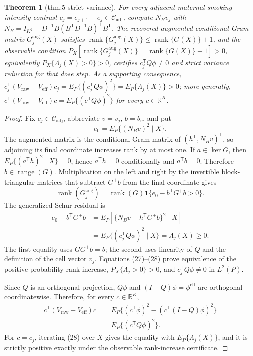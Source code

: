 \documentclass{article}
\newtheorem{theorem}{Theorem}
\begin{document}
\begin{theorem}[thm:5-strict-variance]\label{thm:5-strict-variance}
For every adjacent maternal-smoking intensity contrast \(c_j=e_{j+1}-e_j\in\mathcal C_{\mathrm{adj}}\), compute \(N_Bv_j\) with \(N_B=I_{K^{2}}-D^{-1}B(B^{\mathsf T}D^{-1}B)^{+}B^{\mathsf T}\). The recovered augmented conditional Gram matrix \(G_j^{\mathrm{aug}}(X)\) satisfies \(\operatorname{rank}\{G_j^{\mathrm{aug}}(X)\}\leq\operatorname{rank}\{G(X)\}+1\), and the observable condition \(P_X[\operatorname{rank}\{G_j^{\mathrm{aug}}(X)\}=\operatorname{rank}\{G(X)\}+1]>0\), equivalently \(P_X\{\Lambda_j(X)>0\}>0\), certifies \(c_j^{\mathsf T}Q\phi\neq0\) and strict variance reduction for that dose step. As a supporting consequence, \(c_j^{\mathsf T}(V_{\mathrm{raw}}-V_{\mathrm{eff}})c_j=E_P\{(c_j^{\mathsf T}Q\phi)^2\}=E_P\{\Lambda_j(X)\}>0\); more generally, \(c^{\mathsf T}(V_{\mathrm{raw}}-V_{\mathrm{eff}})c=E_P\{(c^{\mathsf T}Q\phi)^2\}\) for every \(c\in\mathbb R^K\).
\end{theorem}
\begin{proof}
Fix \(c_j\in\mathcal C_{\mathrm{adj}}\), abbreviate \(v=v_j\), \(b=b_v\), and put
\[
 e_0=E_P\{(N_Bv)^2\mid X\}. \tag{26}
\]
The augmented matrix is the conditional Gram matrix of \((h^{\mathsf T},N_Bv)^{\mathsf T}\), so adjoining its final coordinate increases rank by at most one.  If \(a\in\ker G\), then
\(E_P\{(a^{\mathsf T}h)^2\mid X\}=0\), hence \(a^{\mathsf T}h=0\) conditionally and \(a^{\mathsf T}b=0\).  Therefore \(b\in\operatorname{range}(G)\).  Multiplication on the left and right by the invertible block-triangular matrices that subtract \(G^+b\) from the final coordinate gives
\[
 \operatorname{rank}(G_j^{\mathrm{aug}})
 =\operatorname{rank}(G)
 \mathbf 1\{e_0-b^{\mathsf T}G^+b>0\}. \tag{27}
\]
The generalized Schur residual is
\[
\begin{aligned}
 e_0-b^{\mathsf T}G^+b
 &=E_P\!\left[\{N_Bv-h^{\mathsf T}G^+b\}^2\mid X\right]\\
 &=E_P\{(c_j^{\mathsf T}Q\phi)^2\mid X\}
 =\Lambda_j(X)\geq0. \tag{28}
\end{aligned}
\]
The first equality uses \(GG^+b=b\); the second uses linearity of \(Q\) and the definition of the cell vector \(v_j\).  Equations (27)--(28) prove equivalence of the positive-probability rank increase, \(P_X\{\Lambda_j>0\}>0\), and \(c_j^{\mathsf T}Q\phi\ne0\) in \(L^2(P)\).

Since \(Q\) is an orthogonal projection, \(Q\phi\) and \((I-Q)\phi=\phi^{\mathrm{eff}}\) are orthogonal coordinatewise.  Therefore, for every \(c\in\mathbb R^K\),
\[
\begin{aligned}
 c^{\mathsf T}(V_{\mathrm{raw}}-V_{\mathrm{eff}})c
 &=E_P\{(c^{\mathsf T}\phi)^2-(c^{\mathsf T}(I-Q)\phi)^2\}\\
 &=E_P\{(c^{\mathsf T}Q\phi)^2\}. \tag{29}
\end{aligned}
\]
For \(c=c_j\), iterating (28) over \(X\) gives the equality with \(E_P\{\Lambda_j(X)\}\), and it is strictly positive exactly under the observable rank-increase certificate.
\end{proof}
\end{document}
